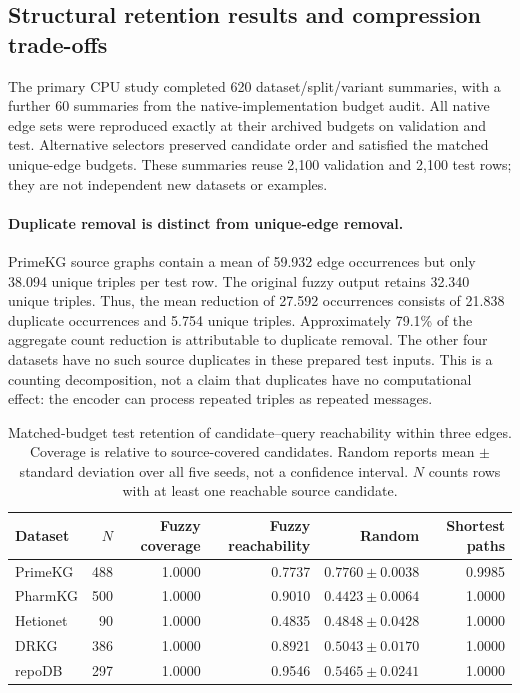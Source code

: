\subsection{Structural retention results and compression trade-offs}

The primary CPU study completed 620 dataset/split/variant summaries, with a
further 60 summaries from the native-implementation budget audit. All native
edge sets were reproduced exactly at their archived budgets on validation and
test. Alternative selectors preserved candidate order and satisfied the matched
unique-edge budgets. These summaries reuse 2,100 validation and 2,100 test rows;
they are not independent new datasets or examples.

\paragraph{Duplicate removal is distinct from unique-edge removal.}
PrimeKG source graphs contain a mean of 59.932 edge occurrences but only 38.094
unique triples per test row. The original fuzzy output retains 32.340 unique
triples. Thus, the mean reduction of 27.592 occurrences consists of 21.838
duplicate occurrences and 5.754 unique triples. Approximately 79.1\% of the
aggregate count reduction is attributable to duplicate removal. The other four
datasets have no such source duplicates in these prepared test inputs. This is
a counting decomposition, not a claim that duplicates have no computational
effect: the encoder can process repeated triples as repeated messages.

\begin{table}[t]
\centering\small
\caption{Matched-budget test retention of candidate--query reachability within
three edges. Coverage is relative to source-covered candidates. Random reports
mean $\pm$ standard deviation over all five seeds, not a confidence interval.
$N$ counts rows with at least one reachable source candidate.}
\label{tab:c3-reachability}
\begin{tabular}{lrrrrr}
\hline
Dataset & $N$ & Fuzzy coverage & Fuzzy reachability & Random & Shortest paths \\
\hline
PrimeKG & 488 & 1.0000 & 0.7737 & $0.7760\pm0.0038$ & 0.9985 \\
PharmKG & 500 & 1.0000 & 0.9010 & $0.4423\pm0.0064$ & 1.0000 \\
Hetionet & 90 & 1.0000 & 0.4835 & $0.4848\pm0.0428$ & 1.0000 \\
DRKG & 386 & 1.0000 & 0.8921 & $0.5043\pm0.0170$ & 1.0000 \\
repoDB & 297 & 1.0000 & 0.9546 & $0.5465\pm0.0241$ & 1.0000 \\
\hline
\end{tabular}
\end{table}

